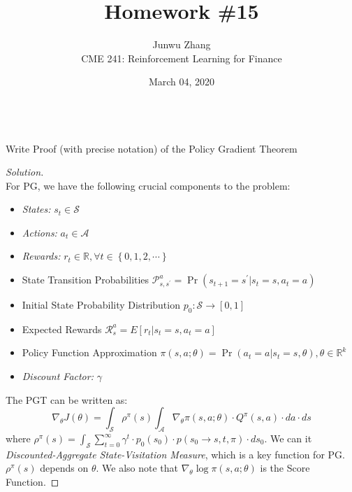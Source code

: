 \documentclass[12pt]{article}
\date{March 04, 2020}
\newenvironment{problem}[2][Problem]{\begin{trivlist}
\item[\hskip \labelsep {\bfseries #1}\hskip \labelsep {\bfseries #2.}]}{\end{trivlist}}
\newenvironment{solution}
  {\renewcommand\qedsymbol{$\blacksquare$}\begin{proof}[Solution]}
  {\end{proof}}
\begin{document}
 
\title{Homework \#15}
\author{Junwu Zhang\\ 
CME 241: Reinforcement Learning for Finance \\}
\maketitle

\begin{problem}{1}
\text{ }\\
Write Proof (with precise notation) of the Policy Gradient Theorem
\end{problem}
\begin{solution}
\text{ }\\
For \gls{PG}, we have the following crucial components to the problem:
\begin{itemize}[noitemsep]
	\item \textit{States:} $s_t \in \mathcal{S}$
	\item \textit{Actions:} $a_t \in \mathcal{A}$
	\item \textit{Rewards:} $r_t \in \mathbb{R}, \forall t \in \left\{0, 1, 2, \cdots\right\}$
	\item State Transition Probabilities $\mathcal{P}_{s, s^{\prime}}^{a}=\operatorname{Pr}\left(s_{t+1}=s^{\prime} | s_{t}=s, a_{t}=a\right)$
	\item Initial State Probability Distribution $p_{0}: \mathcal{S} \rightarrow[0,1]$
	\item Expected Rewards $\mathcal{R}_{s}^{a}=E\left[r_{t} | s_{t}=s, a_{t}=a\right]$
	\item Policy Function Approximation $\pi(s, a ; \theta)=\operatorname{Pr}\left(a_{t}=a | s_{t}=s, \theta\right), \theta \in \mathbb{R}^{k}$
	\item \textit{Discount Factor:} $\gamma$
\end{itemize}
The \gls{PGT} can be written as:
\begin{equation}\label{eq:PGT_eqn}
\nabla_{\theta} J(\theta)=\int_{\mathcal{S}} \rho^{\pi}(s) \int_{\mathcal{A}} \nabla_{\theta} \pi(s, a ; \theta) \cdot Q^{\pi}(s, a) \cdot d a \cdot d s
\end{equation}
where $\rho^{\pi}(s)=\int_{\mathcal{S}} \sum_{t=0}^{\infty} \gamma^{t} \cdot p_{0}\left(s_{0}\right) \cdot p\left(s_{0} \rightarrow s, t, \pi\right) \cdot d s_{0}$. We can it \textit{Discounted-Aggregate State-Visitation Measure}, which is a key function for \gls{PG}. $\rho^{\pi}(s)$ depends on $\theta$. We also note that $\nabla_{\theta} \log \pi(s, a ; \theta)$ is the Score Function.


\end{solution}
\end{document}

